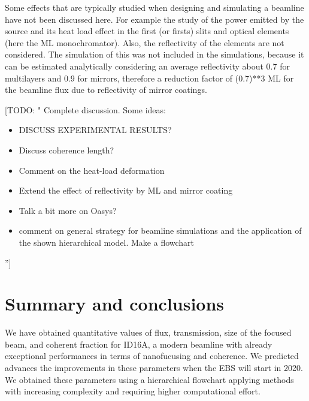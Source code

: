 \documentclass{iucr}              %
\newcommand{\todo}[1]{{\color{red}[TODO: "#1'']}}
\newcommand{\inred}[1]{{\color{red}#1}}
\begin{document}
Some effects that are typically studied when designing and simulating a beamline have not been discussed here. For example the study of the power emitted by the source and its heat load effect in the first (or firsts) slits and optical elements (here the ML monochromator). Also, the reflectivity of the elements are not considered. The simulation of this was not included in the simulations, because it can be estimated analytically considering an average reflectivity about \inred{0.7 for multilayers and 0.9 for mirrors, therefore a reduction factor of (0.7)**3 ML for the beamline flux due to reflectivity of mirror coatings}. 

\todo{
Complete discussion. Some ideas:
\begin{itemize}
 \item DISCUSS EXPERIMENTAL RESULTS?
 \item Discuss coherence length?
 \item Comment on the heat-load deformation 
 \item Extend the effect of reflectivity by ML and mirror coating
 \item Talk a bit more on Oasys?
 \item comment on general strategy for beamline simulations and the application of the shown hierarchical model. Make a flowchart
\end{itemize}
 }

\section{Summary and conclusions}
\label{summary}

We have obtained quantitative values of flux, transmission, size of the focused beam, and coherent fraction for ID16A, a modern beamline with already exceptional performances in terms of nanofucusing and coherence. We predicted advances the improvements in these parameters when the EBS will start in 2020. We obtained these parameters using a hierarchical flowchart applying methods with increasing complexity and requiring higher computational effort. 
\end{document}
